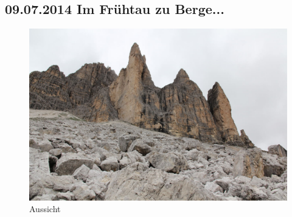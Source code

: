 \subsection{09.07.2014 Im Frühtau zu Berge...}

\begin{figure}[ht]
    \centering
    \includegraphics[width=\textwidth]{../Bilder/Dolomiten/22.jpg}
    \caption{Aussicht}
    \label{img:SpitzerBerg}
\end{figure}


